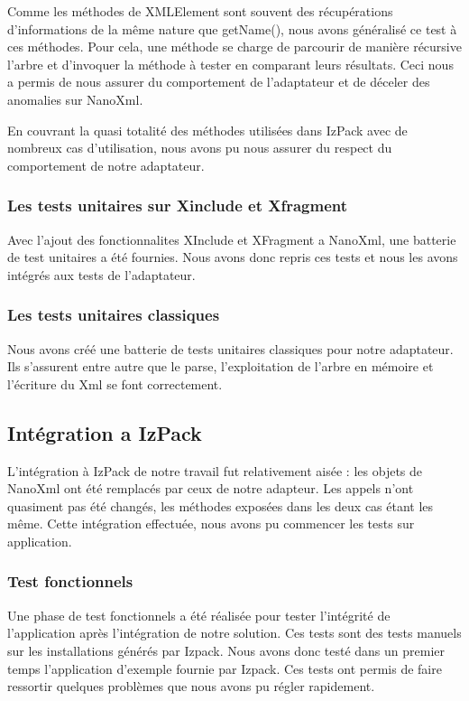 Comme les méthodes de XMLElement sont souvent des récupérations d'informations de la même nature que getName(), nous avons généralisé ce test à ces méthodes.
Pour cela, une méthode se charge de parcourir de manière récursive l'arbre et d'invoquer la méthode à tester en comparant leurs résultats.
Ceci nous a permis de nous assurer du comportement de l'adaptateur et de déceler des anomalies sur NanoXml.

En couvrant la quasi totalité des méthodes utilisées dans IzPack avec de nombreux cas d'utilisation, nous avons pu nous assurer du respect du comportement de notre adaptateur.
\subsubsection{Les tests unitaires sur Xinclude et Xfragment}
Avec l'ajout des fonctionnalites XInclude et XFragment a NanoXml, une batterie de test unitaires a été fournies.
Nous avons donc repris ces tests et nous les avons intégrés aux tests de l'adaptateur.
\subsubsection{Les tests unitaires classiques}
Nous avons créé une batterie de tests unitaires classiques pour notre adaptateur.
Ils s'assurent entre autre que le parse, l'exploitation de l'arbre en mémoire et l'écriture du Xml se font correctement.
\subsection{Intégration a IzPack}
L'intégration à IzPack de notre travail fut relativement aisée : les objets de NanoXml ont été remplacés par ceux de notre adapteur.
Les appels n'ont quasiment pas été changés, les méthodes exposées dans les deux cas étant les même.
Cette intégration effectuée, nous avons pu commencer les tests sur application.

\subsubsection{Test fonctionnels}
Une phase de test fonctionnels a été réalisée pour tester l'intégrité de l'application après l'intégration de notre solution.
Ces tests sont des tests manuels sur les installations générés par Izpack.
Nous avons donc testé dans un premier temps l'application d'exemple fournie par Izpack.
Ces tests ont permis de faire ressortir quelques problèmes que nous avons pu régler rapidement.


